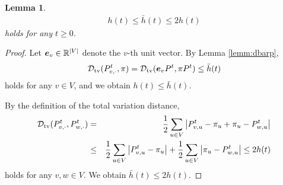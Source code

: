 \documentclass[letter, 11pt]{article}
\renewcommand{\Vec}[1]{\mbox{\boldmath $#1$}}
\newcommand{\1}{\mbox{1}\hspace{-0.25em}\mbox{l}}
\newtheorem{lemma}[theorem]{Lemma}
\begin{document}
\begin{lemma}
\label{lemm:ddbarineq}
\begin{eqnarray*}
h(t)\leq \bar{h}(t)\leq 2h(t)
\end{eqnarray*}
holds for any $t\geq 0$. 
\end{lemma} 
\begin{proof}
Let $\Vec e_v\in \mathbb{R}^{|V|}$ denote the $v$-th unit vector. 
By Lemma \ref{lemm:dbarp}, 
\begin{eqnarray*}
\dtv(P^t_{v, \cdot}, \pi)
=\dtv(\Vec e_v P^t, \pi P^t)
\leq \bar{h}(t) 
\end{eqnarray*}
holds for any $v\in V$, and we obtain $h(t)\leq \bar{h}(t)$. 

By the definition of the total variation distance, 
\begin{eqnarray*}
{\cal D}_{\rm tv}(P^t_{v, \cdot}, P^t_{w, \cdot} )
&=&\frac{1}{2}\sum_{u\in V} \left| P^t_{v, u}-\pi_u+\pi_u-P^t_{w, u}\right|\\
&\leq &\frac{1}{2}\sum_{u\in V} \left| P^t_{v, u}-\pi_u\right| +\frac{1}{2}\sum_{u\in V} \left| \pi_u-P^t_{w, u}\right|
\leq  2h(t)
\end{eqnarray*}
holds for any $v, w\in V$. We obtain $\bar{h}(t)\leq 2h(t)$. 
\end{proof}
\end{document}
